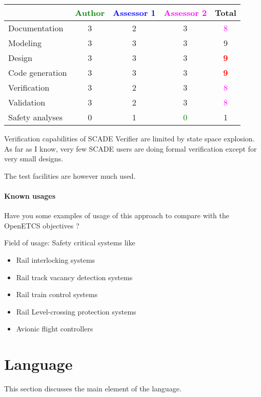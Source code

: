 \begin{tabular}{|l | c | c | c | c|}
\hline
& \textcolor{green}{Author} & \textcolor{blue}{Assessor 1} & \textcolor{magenta}{Assessor 2} & Total \\
\hline 
Documentation &  3  & 2     &3 & \textcolor{magenta}{8}  \\
\hline
Modeling &  3  & 3     &3 &  9 \\
\hline
Design &  3  & 3     &3 & \textcolor{red}{\textbf{9}} \\
\hline
Code generation &  3  & 3     &3 & \textcolor{red}{\textbf{9}} \\
\hline
Verification &  3  & 2     &3 & \textcolor{magenta}{8} \\
\hline
Validation &  3  & 2     &3 & \textcolor{magenta}{8} \\
\hline
Safety analyses &  0  & 1     & \textcolor{green}{0}   & 1     \\
\hline
\end{tabular}


\begin{assessor1}
Verification capabilities of SCADE Verifier are limited by state space
explosion. As far as I know, very few SCADE users are doing formal
verification except for very small designs.

The test facilities are however much used.
\end{assessor1}


\paragraph{Known usages} Have you some examples of usage of this approach to  compare with the OpenETCS objectives ?

Field of usage: Safety critical systems like
\begin{itemize}
	\item Rail interlocking systems
	\item Rail track vacancy detection systems
	\item Rail train control systems
	\item Rail Level-crossing protection systems
	\item Avionic flight controllers
\end{itemize}

\section{Language}
This section discusses the main element of the language.

